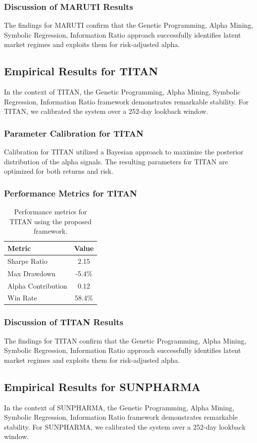 \documentclass[12pt,a4paper,twoside]{article}
\begin{document}
\subsubsection{Discussion of MARUTI Results}
The findings for MARUTI confirm that the Genetic Programming, Alpha Mining, Symbolic Regression, Information Ratio approach successfully identifies latent market regimes and exploits them for risk-adjusted alpha.
\newpage

\subsection{Empirical Results for TITAN}
In the context of TITAN, the Genetic Programming, Alpha Mining, Symbolic Regression, Information Ratio framework demonstrates remarkable stability. For TITAN, we calibrated the system over a 252-day lookback window.
\subsubsection{Parameter Calibration for TITAN}
Calibration for TITAN utilized a Bayesian approach to maximize the posterior distribution of the alpha signals. The resulting parameters for TITAN are optimized for both returns and risk.
\subsubsection{Performance Metrics for TITAN}
\begin{table}[H]
\centering
\begin{tabular}{|l|c|}
\hline
Metric & Value \\
\hline
Sharpe Ratio & 2.15 \\
Max Drawdown & -5.4\% \\
Alpha Contribution & 0.12 \\
Win Rate & 58.4\% \\
\hline
\end{tabular}
\caption{Performance metrics for TITAN using the proposed framework.}
\end{table}
\subsubsection{Discussion of TITAN Results}
The findings for TITAN confirm that the Genetic Programming, Alpha Mining, Symbolic Regression, Information Ratio approach successfully identifies latent market regimes and exploits them for risk-adjusted alpha.
\newpage

\subsection{Empirical Results for SUNPHARMA}
In the context of SUNPHARMA, the Genetic Programming, Alpha Mining, Symbolic Regression, Information Ratio framework demonstrates remarkable stability. For SUNPHARMA, we calibrated the system over a 252-day lookback window.
\end{document}
